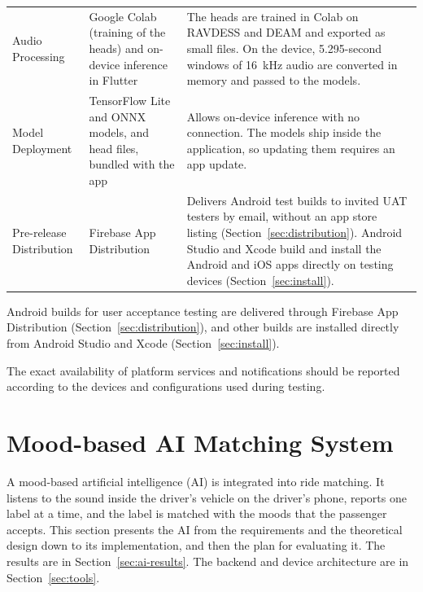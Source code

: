 \begin{table}[htbp]
\begin{tabular}{|>{\raggedright\arraybackslash}p{}|>{\raggedright\arraybackslash}p{}|>{\raggedright\arraybackslash}p{}|}
        Audio Processing & Google Colab (training of the heads) and on-device inference in Flutter & The heads are trained in Colab on RAVDESS and DEAM and exported as small files. On the device, 5.295-second windows of 16~kHz audio are converted in memory and passed to the models. \\      
        
        Model Deployment & TensorFlow Lite and ONNX models, and head files, bundled with the app & Allows on-device inference with no connection. The models ship inside the application, so updating them requires an app update. \\ 

                Pre-release Distribution & Firebase App Distribution & Delivers Android test builds to invited UAT testers by email, without an app store listing (Section~\ref{sec:distribution}). Android Studio and Xcode build and install the Android and iOS apps directly on testing devices (Section~\ref{sec:install}). \\

        \hline
    \end{tabular}
    \label{tab: tools}
\end{table}

Android builds for user acceptance testing are delivered through Firebase App Distribution (Section~\ref{sec:distribution}), and other builds are installed directly from Android Studio and Xcode (Section~\ref{sec:install}).

The exact availability of platform services and notifications should be reported according to the devices and configurations used during testing.


\section{Mood-based AI Matching System}
\label{sec:ai}
A mood-based artificial intelligence (AI) is integrated into ride matching. It listens to the sound inside the driver's vehicle on the driver's phone, reports one label at a time, and the label is matched with the moods that the passenger accepts. This section presents the AI from the requirements and the theoretical design down to its implementation, and then the plan for evaluating it. The results are in Section~\ref{sec:ai-results}. The backend and device architecture are in Section~\ref{sec:tools}.

